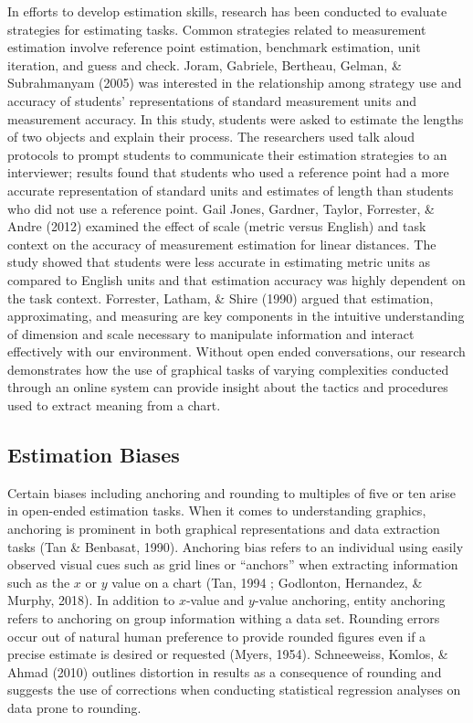 \documentclass[print]{nuthesis}
\begin{document}
In efforts to develop estimation skills, research has been conducted to evaluate strategies for estimating tasks.
Common strategies related to measurement estimation involve reference point estimation, benchmark estimation, unit iteration, and guess and check.
Joram, Gabriele, Bertheau, Gelman, \& Subrahmanyam (2005) was interested in the relationship among strategy use and accuracy of students' representations of standard measurement units and measurement accuracy.
In this study, students were asked to estimate the lengths of two objects and explain their process.
The researchers used talk aloud protocols to prompt students to communicate their estimation strategies to an interviewer; results found that students who used a reference point had a more accurate representation of standard units and estimates of length than students who did not use a reference point.
Gail Jones, Gardner, Taylor, Forrester, \& Andre (2012) examined the effect of scale (metric versus English) and task context on the accuracy of measurement estimation for linear distances.
The study showed that students were less accurate in estimating metric units as compared to English units and that estimation accuracy was highly dependent on the task context.
Forrester, Latham, \& Shire (1990) argued that estimation, approximating, and measuring are key components in the intuitive understanding of dimension and scale necessary to manipulate information and interact effectively with our environment.
Without open ended conversations, our research demonstrates how the use of graphical tasks of varying complexities conducted through an online system can provide insight about the tactics and procedures used to extract meaning from a chart.

\hypertarget{estimation-biases}{%
\subsection{Estimation Biases}\label{estimation-biases}}

Certain biases including anchoring and rounding to multiples of five or ten arise in open-ended estimation tasks.
When it comes to understanding graphics, anchoring is prominent in both graphical representations and data extraction tasks (Tan \& Benbasat, 1990).
Anchoring bias refers to an individual using easily observed visual cues such as grid lines or ``anchors'' when extracting information such as the \(x\) or \(y\) value on a chart (Tan, 1994 ; Godlonton, Hernandez, \& Murphy, 2018).
In addition to \(x\)-value and \(y\)-value anchoring, entity anchoring refers to anchoring on group information withing a data set.
Rounding errors occur out of natural human preference to provide rounded figures even if a precise estimate is desired or requested (Myers, 1954).
Schneeweiss, Komlos, \& Ahmad (2010) outlines distortion in results as a consequence of rounding and suggests the use of corrections when conducting statistical regression analyses on data prone to rounding.
\end{document}

